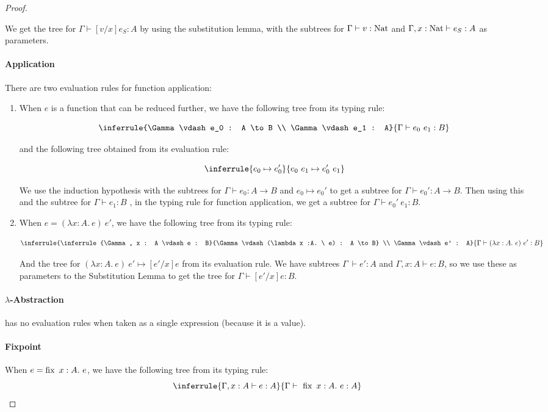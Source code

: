 \begin{proof}
\begin{enumerate}
{We get the tree for $\Gamma \vdash [v/x]e_S :  A$ by using the substitution lemma, with the subtrees for $\Gamma \vdash v :\operatorname{Nat}$ and $\Gamma , x : \operatorname{Nat} \vdash e_S : A$ as parameters.}
\end{enumerate}
\paragraph{Application} There are two evaluation rules for function application:
\begin{enumerate}
\item{When $e$ is a function that can be reduced further, we have the following tree from its typing rule: 

$$
\inferrule{\Gamma \vdash e_0 : A \to B \\  \Gamma \vdash e_1 : A}
  {\Gamma \vdash e_0 \ e_1 : B}
$$  

and the following tree obtained from its evaluation rule:

$$
\inferrule {e_0 \mapsto e_0'} {e_0 \ e_1 \mapsto e_0' \ e_1}
$$

We use the induction hypothesis with the subtrees for $\Gamma \vdash e_0 : A \to B$ and $e_0 \mapsto e_0'$ to get a subtree for $\Gamma \vdash e_0' : A \to B$. Then using this and the subtree for $\Gamma \vdash e_1 : B$ , in the typing rule for function application, we get a subtree for $\Gamma \vdash e_0' \ e_1 : B$. }
\item{When $e = (\lambda x: A .\ e) \ e'$, we have the following tree from its typing rule:

$$
\inferrule{\inferrule{\Gamma, x : A \vdash e : B}{\Gamma \vdash (\lambda x :A. \ e) : A \to B} \\  \Gamma \vdash e' : A}
  {\Gamma \vdash (\lambda x :A. \ e) \ e' : B}
$$  

And the tree for $(\lambda x :A. \ e) \ e' \mapsto [e'/x]e$ from its evaluation rule. We have subtrees $\Gamma \ \vdash e' : A$ and $\Gamma, x : A \vdash e : B$, so we use these as parameters to the Substitution Lemma to get the tree for $\Gamma \vdash [e'/x]e : B$.}
\end{enumerate}

\paragraph{$\lambda$-Abstraction} has no evaluation rules when taken as a single expression (because it is a value).

\paragraph{Fixpoint}
When $e = \operatorname{fix} \ x:A. \ e$, we have the following tree from its typing rule:
$$
\inferrule{\Gamma, x : A \vdash e : A }
  {\Gamma \vdash \  \fix \ x:A . \ e : A}
$$


\end{proof}

